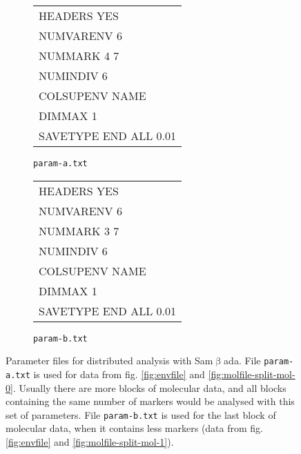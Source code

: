 \documentclass[a4paper,11pt]{article}
\newcommand{\smb}{\textsf{Sam$\upbeta$ada}}
\begin{document}
\begin{figure}[htbp]
\centering

\hfill%
\begin{subfigure}{6cm}
\centering
\ttfamily
\begin{tabular}{|l|}
\hline
HEADERS YES\\	
NUMVARENV 6\\	
NUMMARK 4 7	\\
NUMINDIV 6\\
COLSUPENV NAME\\
DIMMAX 1\\
SAVETYPE END ALL 0.01\\
\hline
\end{tabular}%
\caption{\texttt{param-a.txt}}
\label{fig:fichier-param-parallele-a}
\end{subfigure}%
\hfill%
\begin{subfigure}{6cm}
\centering
\ttfamily
\begin{tabular}{|l|}
\hline
HEADERS YES\\	
NUMVARENV 6\\	
NUMMARK 3 7	\\
NUMINDIV 6\\
COLSUPENV NAME\\
DIMMAX 1\\
SAVETYPE END ALL 0.01\\
\hline
\end{tabular}%
\caption{\texttt{param-b.txt}}
\label{fig:fichier-param-parallele-b}
\end{subfigure}%
\hfill

\caption[Exemple de fichier de paramètres pour \smb.]
{
	Parameter files for distributed analysis with \smb.
	File \texttt{param-a.txt} is used for data from fig. \ref{fig:envfile} and \ref{fig:molfile-split-mol-0}.
	Usually there are more blocks of molecular data, and all blocks containing the same number of markers would be analysed with this set of parameters.
	File \texttt{param-b.txt} is used for the last block of molecular data, when it contains less markers (data from fig. \ref{fig:envfile} and \ref{fig:molfile-split-mol-1}).
}
\label{fig:fichier-param-parallele}
\end{figure}
\end{document}
